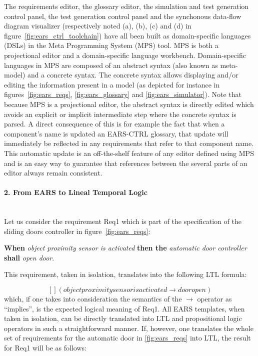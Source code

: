 The requirements editor, the glossary editor, the simulation and test generation
control panel, the test generation control panel and the synchonous data-flow
diagram visualizer (respectively noted (\textsf{a}), (\textsf{b}), (\textsf{c})
and (\textsf{d}) in figure~\ref{fig:ears_ctrl_toolchain}) have all been built as 
domain-specific languages (DSLs) in the Meta Programming System (MPS) tool. MPS
is both a projectional editor and a domain-specific language workbench.
Domain-specific languages in MPS are composed of an abstract syntax (also known
as meta-model) and a concrete syntax. The concrete syntax allows displaying
and/or editing the information present in a model (as depicted for instance in
figures~\ref{fig:ears_reqs}, \ref{fig:ears_glossary} and
\ref{fig:ears_simulator}). Note that because MPS is a projectional editor, the
abstract syntax is directly edited which avoids an explicit or implicit
intermediate step where the concrete syntax is parsed.
A direct consequence of this is for example the fact that when a component's
name is updated an \textsf{EARS-CTRL} glossary, that update will immediately be
reflected in any requirements that refer to that component name. This automatic
update is an off-the-shelf feature of any editor defined using MPS and is an
easy way to guarantee that references between the several parts of an editor
always remain consistent.

\paragraph{2. From EARS to Lineal Temporal Logic\\\\}
\label{sec:ears_LTL} 

Let us consider the requirement \textsf{Req1} which is part of the
specification of the sliding doors controller in figure~\ref{fig:ears_reqs}:

\begin{center}
\textbf{When} \emph{object proximity sensor is activated} \textbf{then the} \emph{automatic door controller} \textbf{shall}
\emph{open door}.
\end{center}

 This requirement, taken in isolation, translates into the following LTL
 formula:
 
$$[] (objectproximitysensorisactivated \rightarrow dooropen)$$
which, if one takes into consideration the semantics of the $\rightarrow$
operator as ``implies'', is the expected logical meaning of \textsf{Req1}. All EARS
templates, when taken in isolation, can be directly translated into LTL and
propositional logic operators in such a straightforward manner.
If, however, one translates the whole set of requirements for the automatic
door in \ref{fig:ears_reqs} into LTL, the result for \textsf{Req1} will be as follows:

